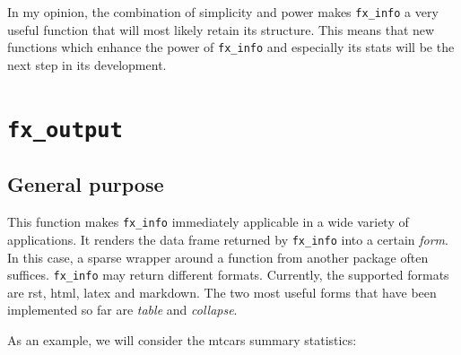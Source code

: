 \documentclass[]{report}
\newenvironment{Shaded}{\begin{snugshade}}{\end{snugshade}}
\newcommand{\KeywordTok}[1]{\textcolor[rgb]{0.13,0.29,0.53}{\textbf{#1}}}
\newcommand{\DataTypeTok}[1]{\textcolor[rgb]{0.13,0.29,0.53}{#1}}
\newcommand{\DecValTok}[1]{\textcolor[rgb]{0.00,0.00,0.81}{#1}}
\newcommand{\StringTok}[1]{\textcolor[rgb]{0.31,0.60,0.02}{#1}}
\newcommand{\ControlFlowTok}[1]{\textcolor[rgb]{0.13,0.29,0.53}{\textbf{#1}}}
\newcommand{\OperatorTok}[1]{\textcolor[rgb]{0.81,0.36,0.00}{\textbf{#1}}}
\newcommand{\NormalTok}[1]{#1}
\theoremstyle{definition}
\theoremstyle{definition}
\theoremstyle{definition}
\theoremstyle{remark}
\begin{document}
In my opinion, the combination of simplicity and power makes
\texttt{fx\_info} a very useful function that will most likely retain
its structure. This means that new functions which enhance the power of
\texttt{fx\_info} and especially its stats will be the next step in its
development.

\section{\texorpdfstring{\texttt{fx\_output}}{fx\_output}}\label{fx_output}

\subsection{General purpose}\label{general-purpose-2}

This function makes \texttt{fx\_info} immediately applicable in a wide
variety of applications. It renders the data frame returned by
\texttt{fx\_info} into a certain \emph{form}. In this case, a sparse
wrapper around a function from another package often suffices.
\texttt{fx\_info} may return different formats. Currently, the supported
formats are rst, html, latex and markdown. The two most useful forms
that have been implemented so far are \emph{table} and \emph{collapse}.

As an example, we will consider the mtcars summary statistics:

\begin{Shaded}
\end{Shaded}
\end{document}
